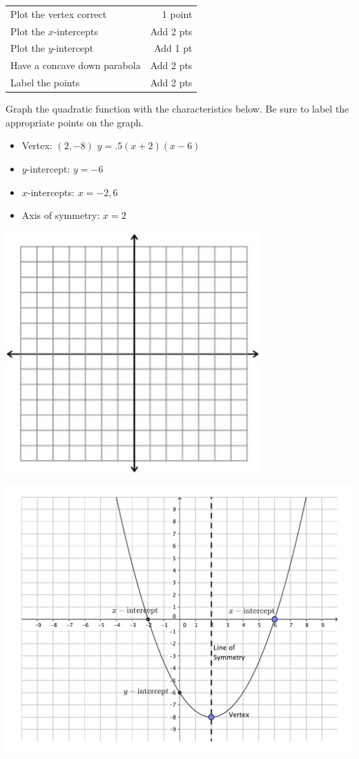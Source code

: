 {
	\begin{tabular}{l r}
	Plot the vertex correct&1 point\\
	Plot the $x$-intercepts& Add 2 pts\\
	Plot the $y$-intercept & Add 1 pt\\
	Have a concave down parabola&Add 2 pts\\
	Label the points&Add 2 pts
	\end{tabular}
}
{
	Graph the quadratic function with the characteristics below.  Be sure to label the appropriate points on the graph.
	\begin{itemize}
	\item	Vertex: $(2,-8)$  $y=.5(x+2)(x-6)$
	\item $y$-intercept: $y=-6$ 
	\item $x$-intercepts: $x=-2,6$
	\item Axis of symmetry: $x=2$
	\end{itemize}
	\begin{onlyproblem}\begin{center}\includegraphics{fig-graphpaper.png}\end{center}\end{onlyproblem} \begin{onlysolution}\begin{center}\includegraphics{fig100-18_5-d-answer}\end{center}\end{onlysolution}}
